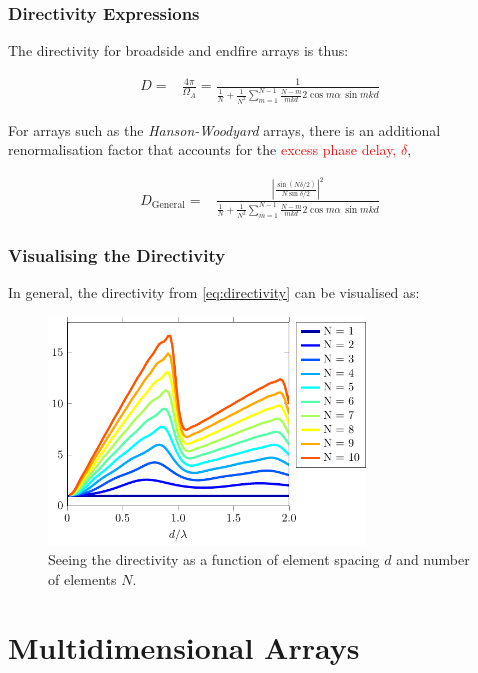 \documentclass[10pt]{beamer}
\begin{document}
\begin{frame}
    \frametitle{Directivity Expressions}
The directivity for broadside and endfire arrays is thus:

\begin{align*}
    D {}=& \frac{4\pi }{\Omega_A} = \frac{1}{\frac{1}{N}+\frac{1}{N^{2}} \sum_{m=1}^{N-1} \frac{N-m}{m k d} 2 \cos m \alpha \, \sin m k d}
\end{align*}

For arrays such as the \textit{Hanson-Woodyard} arrays, there is an additional renormalisation factor that accounts for the \textcolor{red}{excess phase delay, $\delta$},

\begin{align}
    D_{\text{General}} {}=&  \frac{\left|\frac{\sin (N \delta/2 )}{N \sin \delta/2 }\right|^2}{\frac{1}{N}+\frac{1}{N^{2}} \sum_{m=1}^{N-1} \frac{N-m}{m k d} 2 \cos m \alpha \, \sin m k d}
    \label{eq:directivity}
\end{align}
\end{frame}

\begin{frame}
    \frametitle{Visualising the Directivity}
In general, the directivity from \eqref{eq:directivity} can be visualised as:
\begin{figure}[h!]
    \centering
    \includegraphics[width=0.75\textwidth]{directivity.pdf}
    \caption{Seeing the directivity as a function of element spacing $d$ and number of elements $N$.}
    \label{fig:directivity}
\end{figure} 
\end{frame}

\section{Multidimensional Arrays}
\end{document}
